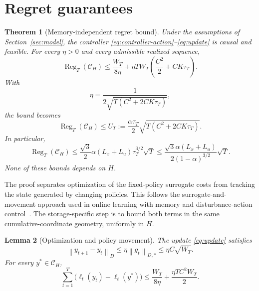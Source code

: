 \documentclass[11pt]{article}
\newtheorem{theorem}{Theorem}[section]
\newtheorem{lemma}[theorem]{Lemma}
\newcommand{\CH}{\mathcal C_H}
\newcommand{\Reg}{\operatorname{Reg}}
\newcommand{\normD}[1]{\left\lVert #1\right\rVert_D}
\newcommand{\normDual}[1]{\left\lVert #1\right\rVert_{D,*}}
\begin{document}
\section{Regret guarantees}
\label{sec:upper}

\begin{theorem}[Memory-independent regret bound]
\label{thm:upper}
Under the assumptions of Section~\ref{sec:model}, the controller
\eqref{eq:controller-action}--\eqref{eq:update} is causal and
feasible. For every $\eta>0$ and every admissible realized sequence,
\begin{equation}
\label{eq:upper-eta}
\Reg_T(\CH)
\le
\frac{W_T}{8\eta}
+\eta T W_T\left(\frac{C^2}{2}+CK\tau_T\right).
\end{equation}
With
\begin{equation}
\label{eq:eta}
\eta=\frac{1}{2\sqrt{T(C^2+2CK\tau_T)}},
\end{equation}
the bound becomes
\begin{equation}
\label{eq:upper}
\Reg_T(\CH)
\le U_T
:=
\frac{\alpha\tau_T}{2}
\sqrt{T(C^2+2CK\tau_T)}.
\end{equation}
In particular,
\begin{equation}
\label{eq:upper-simple}
\Reg_T(\CH)
\le
\frac{\sqrt3}{2}\alpha(L_x+L_u)\tau_T^{3/2}\sqrt T
\le
\frac{\sqrt3\alpha(L_x+L_u)}
{2(1-\alpha)^{3/2}}\sqrt T.
\end{equation}
None of these bounds depends on $H$.
\end{theorem}

The proof separates optimization of the fixed-policy surrogate
costs from tracking the state generated by changing policies.
This follows the surrogate-and-movement approach used in online
learning with memory and disturbance-action
control~\cite{anava2015memory,agarwal2019online,kumar2023unbounded}.
The storage-specific step is to bound both terms in the same
cumulative-coordinate geometry, uniformly in $H$.

\begin{lemma}[Optimization and policy movement]
\label{lem:optimization}
The update \eqref{eq:update} satisfies
\begin{equation}
\label{eq:movement}
\normD{y_{t+1}-y_t}
\le\eta\normDual{g_t}
\le\eta C\sqrt{W_T}.
\end{equation}
For every $y^*\in\CH$,
\begin{equation}
\label{eq:surrogate-regret}
\sum_{t=1}^T
\bigl(\ell_t(y_t)-\ell_t(y^*)\bigr)
\le
\frac{W_T}{8\eta}
+\frac{\eta TC^2W_T}{2}.
\end{equation}
\end{lemma}
\end{document}

